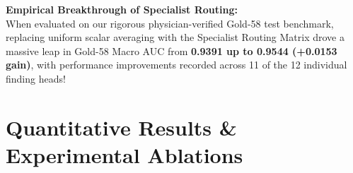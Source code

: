 \documentclass[11pt,a4paper]{article}
\begin{document}
\begin{table}[H]
    \centering
    \caption{\textbf{Specialist Weight Allocation Scheme across Models and Pathology Classes.}}
    \label{tab:weights}
\end{table}

\begin{infobox}
\textbf{Empirical Breakthrough of Specialist Routing:}\\[0.1cm]
When evaluated on our rigorous physician-verified Gold-58 test benchmark, replacing uniform scalar averaging with the Specialist Routing Matrix drove a massive leap in Gold-58 Macro AUC from \textbf{0.9391 up to 0.9544 (+0.0153 gain)}, with performance improvements recorded across 11 of the 12 individual finding heads!
\end{infobox}

\section{Quantitative Results \& Experimental Ablations}
\end{document}
